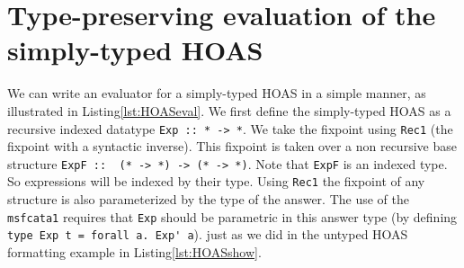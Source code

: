 \section{Type-preserving evaluation of the simply-typed HOAS}
\label{sec:HOASeval}
We can write an evaluator for a simply-typed HOAS in a simple manner,
as illustrated in Listing\;\ref{lst:HOASeval}.
We first define the simply-typed HOAS as a recursive indexed datatype
\lstinline{Exp :: * -> *}. We take the fixpoint using \lstinline{Rec1}
(the fixpoint with a syntactic inverse). This fixpoint is taken over
a non recursive base structure \lstinline{ExpF ::  (* -> *) -> (* -> *)}.
Note that \lstinline{ExpF} is an indexed type. So expressions will be indexed
by their type. Using \lstinline{Rec1} the fixpoint of any structure is also
parameterized by the type of the answer. The use of the \lstinline{msfcata1}
requires that \lstinline{Exp} should be parametric in this answer type
(by defining \lstinline{type Exp t = forall a. Exp' a}). just as we did
in the untyped HOAS formatting example in Listing\;\ref{lst:HOASshow}.

\begin{figure}

\vspace*{-3ex}
\end{figure}

